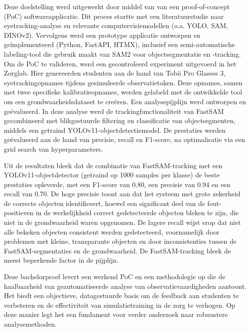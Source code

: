 Deze doelstelling werd uitgewerkt door middel van van een proof-of-concept (PoC) softwareapplicatie. 
Dit proces startte met een literatuurstudie naar eyetracking-analyse en relevante computervisiemodellen (o.a. YOLO, SAM, DINOv2). 
Vervolgens werd een prototype applicatie ontworpen en geïmplementeerd (Python, FastAPI, HTMX), 
inclusief een semi-automatische labeling-tool die gebruik maakt van SAM2 voor objectsegmentatie en -tracking. 
Om de PoC te valideren, werd een gecontroleerd experiment uitgevoerd in het Zorglab. 
Hier genereerden studenten aan de hand van Tobii Pro Glasses 3, eyetrackingopnames tijdens gesimuleerde observatietaken. 
Deze opnames, samen met twee specifieke kalibratieopnames, werden gelabeld met de ontwikkelde tool om een grondwaarheidsdataset te creëren. 
Een analysepijplijn werd ontworpen en geëvalueerd. In deze analyse werd de trackingfunctionaliteit van FastSAM gecombineerd met 
blikgestuurde filtering en classificatie van objectsegmenten, middels een getraind YOLOv11-objectdetectiemodel. 
De prestaties werden geëvalueerd aan de hand van precisie, recall en F1-score, na optimalisatie via een grid search van hyperparameters.

Uit de resultaten bleek dat de combinatie van FastSAM-tracking met een YOLOv11-objectdetector (getraind op 1000 samples per klasse) 
de beste prestaties opleverde, met een F1-score van 0.80, een precisie van 0.94 en een recall van 0.70. 
De hoge precisie toont aan dat het systeem met grote zekerheid de correcte objecten identificeert, 
hoewel een significant deel van de fout-positieven in de werkelijkheid correct gedetecteerde objecten bleken te zijn, die niet in de grondwaarheid waren opgenomen. 
De lagere recall wijst erop dat niet alle bekeken objecten consistent werden gedetecteerd, voornamelijk door problemen met kleine, 
transparante objecten en door inconsistenties tussen de FastSAM-segmentaties en de grondwaarheid. 
De FastSAM-tracking bleek de meest beperkende factor in de pijplijn.

Deze bachelorproef levert een werkend PoC en een methodologie op die de haalbaarheid van geautomatiseerde 
analyse van observatievaardigheden aantoont. 
Het biedt een objectieve, datagestuurde basis om de feedback aan studenten te verbeteren en de effectiviteit van simulatietraining in de zorg te verhogen.
Op deze manier legt het een fundament voor verder onderzoek naar robuustere analysemethoden.